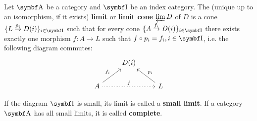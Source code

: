 \begin{definition}\label{def:categorical_limit}\cite[definitions 5.1.19(b), definition 6.3.6]{Leinster2014}
  Let \( \Bold A \) be a category and \( \Bold I \) be an index category. The (unique up to an isomorphism, if it exists) \textbf{limit} or \textbf{limit cone} \( \varprojlim D \) of \( D \) is a cone \( \{ L \overset {p_i} \to D(i) \}_{i \in \Bold I} \) such that for every cone \( \{ A \overset {f_i} \to D(i) \}_{i \in \Bold I} \) there exists exactly one morphism \( f: A \to L \) such that \( f \circ p_i = f_i, i \in \Bold I \), i.e. the following diagram commutes:
  \begin{equation*}
    \begin{tikzcd}
                                                  & D(i) & \\
      A \arrow[ru, "f_i"] \arrow[rr, "f", dotted] &      & L \arrow[lu, "p_i"']
    \end{tikzcd}
  \end{equation*}

  If the diagram \( \Bold I \) is small, its limit is called a \textbf{small limit}. If a category \( \Bold A \) has all small limits, it is called \textbf{complete}.
\end{definition}

